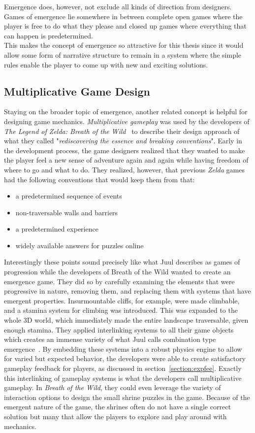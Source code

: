 Emergence does, however, not exclude all kinds of direction from designers. Games of emergence lie somewhere in between complete open games where the player is free to do what they please and closed up games where everything that can happen is predetermined.~\cite{Juul2002}\\ 
This makes the concept of emergence so attractive for this thesis since it would allow some form of narrative structure to remain in a system where the simple rules enable the player to come up with new and exciting solutions.
\subsection{Multiplicative Game Design}
Staying on the broader topic of emergence, another related concept is helpful for designing game mechanics. \textit{Multiplicative gameplay} was used by the developers of \textit{The Legend of Zelda: Breath of the Wild}~\cite{zeldabotw} to describe their design approach of what they called "\textit{rediscovering the essence and breaking conventions}". Early in the development process, the game designers realized that they wanted to make the player feel a new sense of adventure again and again while having freedom of where to go and what to do. They realized, however, that previous \textit{Zelda} games had the following conventions that would keep them from that:
\begin{itemize}
	\item a predetermined sequence of events
	\item non-traversable walls and barriers
	\item a predetermined experience
	\item widely available answers for puzzles online
\end{itemize}
Interestingly these points sound precisely like what Juul describes as games of progression while the developers of Breath of the Wild wanted to create an emergence game. They did so by carefully examining the elements that were progressive in nature, removing them, and replacing them with systems that have emergent properties. Insurmountable cliffs, for example, were made climbable, and a stamina system for climbing was introduced. This was expanded to the whole 3D world, which immediately made the entire landscape traversable, given enough stamina. They applied interlinking systems to all their game objects which creates an immense variety of what Juul calls combination type emergence~\cite{Juul2002}. By embedding these systems into a robust physics engine to allow for varied but expected behavior, the developers were able to create satisfactory gameplay feedback for players, as discussed in section~\ref{section:expfee}. Exactly this interlinking of gameplay systems is what the developers call multiplicative gameplay. In \textit{Breath of the Wild}, they could even leverage the variety of interaction options to design the small shrine puzzles in the game. Because of the emergent nature of the game, the shrines often do not have a single correct solution but many that allow the players to explore and play around with mechanics.~\cite{fujibayashi2017}
